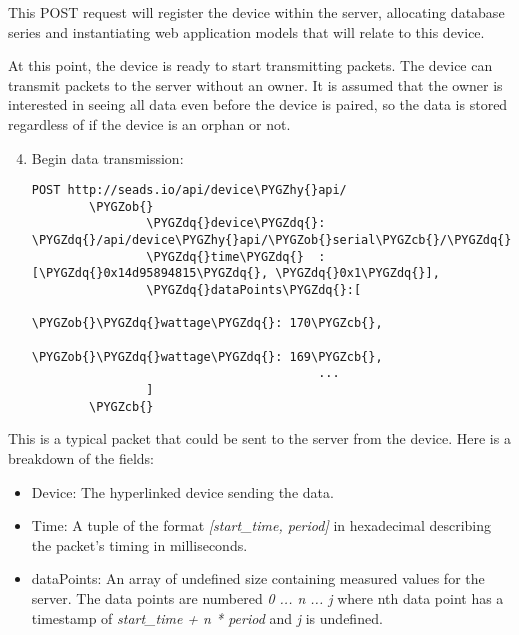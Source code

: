 \documentclass[letterpaper,10pt,english]{sphinxmanual}
\def\PYGZob{\char`\{}
\def\PYGZcb{\char`\}}
\def\PYGZhy{\char`\-}
\def\PYGZdq{\char`\"}
\begin{document}
This POST request will register the device within the server, allocating database series and instantiating web application models that will relate to this device.

At this point, the device is ready to start transmitting packets. The device can transmit packets to the server without an owner. It is assumed that the owner is interested in seeing all data even before the device is paired, so the data is stored regardless of if the device is an orphan or not.
\begin{enumerate}
\setcounter{enumi}{3}
\item {} 
Begin data transmission:

\begin{Verbatim}[commandchars=\\\{\}]
POST http://seads.io/api/device\PYGZhy{}api/
        \PYGZob{}
                \PYGZdq{}device\PYGZdq{}: \PYGZdq{}/api/device\PYGZhy{}api/\PYGZob{}serial\PYGZcb{}/\PYGZdq{},
                \PYGZdq{}time\PYGZdq{}  : [\PYGZdq{}0x14d95894815\PYGZdq{}, \PYGZdq{}0x1\PYGZdq{}],
                \PYGZdq{}dataPoints\PYGZdq{}:[
                                        \PYGZob{}\PYGZdq{}wattage\PYGZdq{}: 170\PYGZcb{},
                                        \PYGZob{}\PYGZdq{}wattage\PYGZdq{}: 169\PYGZcb{},
                                        ...
                ]
        \PYGZcb{}
\end{Verbatim}

\end{enumerate}

This is a typical packet that could be sent to the server from the device. Here is a breakdown of the fields:
\begin{itemize}
\item {} 
Device: The hyperlinked device sending the data.

\item {} 
Time: A tuple of the format \emph{{[}start\_time, period{]}} in hexadecimal describing the packet's timing in milliseconds.

\item {} 
dataPoints: An array of undefined size containing measured values for the server. The data points are numbered \emph{0 ... n ... j} where nth data point has a timestamp of \emph{start\_time + n * period} and \emph{j} is undefined.

\end{itemize}
\end{document}
